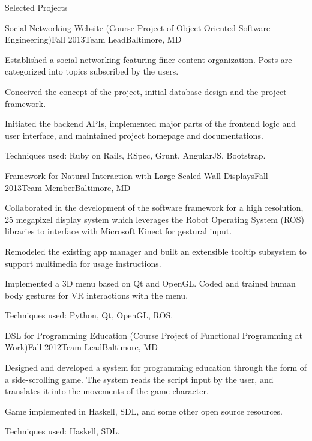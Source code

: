 \documentclass{resume} %
\begin{document}
\begin{rSection}{Selected Projects}
\begin{rSubsection}{Social Networking Website (Course Project of Object Oriented Software Engineering)}{Fall 2013}{Team Lead}{Baltimore, MD}
\item Established a social networking featuring finer content organization. Posts are categorized into topics subscribed by the users.
\item Conceived the concept of the project, initial database design and the project framework.
\item Initiated the backend APIs, implemented major parts of the frontend logic and user interface, and maintained project homepage and documentations.
\item Techniques used: Ruby on Rails, RSpec, Grunt, AngularJS, Bootstrap.
\end{rSubsection}
\begin{rSubsection}{Framework for Natural Interaction with Large Scaled Wall Displays}{Fall 2013}{Team Member}{Baltimore, MD}
\item Collaborated in the development of the software framework for a high resolution, 25 megapixel
display system which leverages the Robot Operating System (ROS) libraries to interface with Microsoft Kinect for gestural input.
\item Remodeled the existing app manager and built an extensible tooltip subsystem to support
multimedia for usage instructions.
\item Implemented a 3D menu based on Qt and OpenGL. Coded and trained human body gestures for VR
interactions with the menu.
\item Techniques used: Python, Qt, OpenGL, ROS.
\end{rSubsection}
\begin{rSubsection}{DSL for Programming Education (Course Project of Functional Programming at Work)}{Fall 2012}{Team Lead}{Baltimore, MD}
\item Designed and developed a system for programming education through the form of a
side-scrolling game. The system reads the script input by the user, and translates it into the movements of the game character.
\item Game implemented in Haskell, SDL, and some other open source resources.
\item Techniques used: Haskell, SDL.
\end{rSubsection}
\end{rSection}
\end{document}
